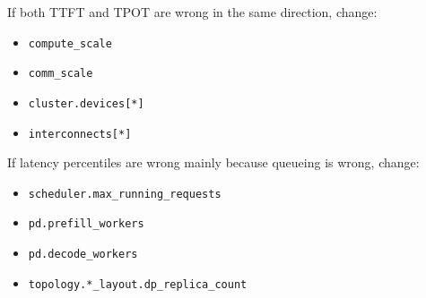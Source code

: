 If both TTFT and TPOT are wrong in the same direction, change:

\begin{itemize}
\item \texttt{compute\_scale}
\item \texttt{comm\_scale}
\item \texttt{cluster.devices[*]}
\item \texttt{interconnects[*]}
\end{itemize}

If latency percentiles are wrong mainly because queueing is wrong, change:

\begin{itemize}
\item \texttt{scheduler.max\_running\_requests}
\item \texttt{pd.prefill\_workers}
\item \texttt{pd.decode\_workers}
\item \texttt{topology.*\_layout.dp\_replica\_count}
\end{itemize}
